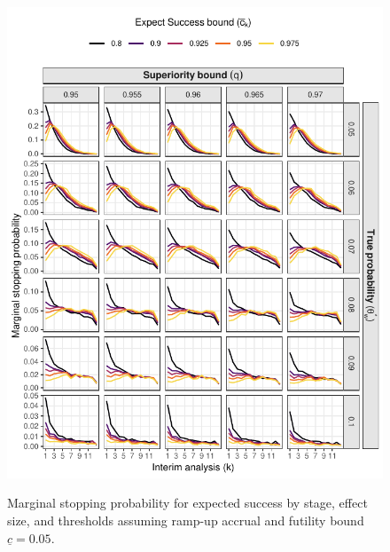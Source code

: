 \documentclass{article}
\begin{document}
\begin{figure}[!ht]
	\caption{Marginal stopping probability for expected success by stage, effect size, and thresholds assuming ramp-up accrual and futility bound $\underline{c}=0.05$.}
	\includegraphics{figures/stop_expect_success_5.pdf}
	\label{fig:stop_expect_success_rampup}
\end{figure}
\end{document}
